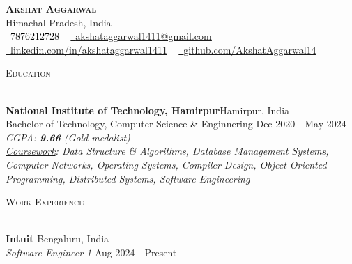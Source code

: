\documentclass[a4paper]{article}
\newcommand{\tinyBulletSep} { \vspace{2mm} }
\newcommand{\bulletSep} { \vspace{2.5mm} }
\newcommand{\sectionSep} { \vspace{3.5mm} }
\newcommand{\lineunder} {
    \vspace*{-8pt} \\
    \hspace*{-15pt} \hrulefill \\
}
\newcommand{\header} [1] {
    {\hspace*{-18pt}\vspace*{6pt} {
        \fontfamily{qcs}\selectfont \large \scshape #1
    }}
    \vspace*{-6pt} \lineunder
    \vspace{1.1mm}
}
\newcommand{\educationItem}[6]{
    \textbf{#1}\hfill #2\\
    #3 \hfill #5\\
    \textit{#4}\\
    #6
}
\newcommand{\experienceItem}[5]{
    \textbf{#1} \hfill #2 \\
    \textit{#3} \hfill #4 \\
    #5
}
\newcommand{\link}[2]{
    {\fontfamily{lmtt}\selectfont\href{#1}{#2}}
}
\begin{document}

\begin{center}
    {\textbf{\Huge \scshape Akshat Aggarwal}} \\ \vspace{1pt}
    Himachal Pradesh, India \\
    \small \textcolor{black}{\raisebox{-0.1\height}\faPhone\
        7876212728} ~ \href{mailto:akshataggarwal1411@gmail.com}{{\raisebox{-0.2\height}\faEnvelope\  \underline{akshataggarwal1411@gmail.com}}} ~
    \href{https://www.linkedin.com/in/akshataggarwal1411/}{{\raisebox{-0.2\height}\faLinkedinSquare\ \underline{linkedin.com/in/akshataggarwal1411}}}  ~
    \href{https://github.com/AkshatAggarwal14}{{\raisebox{-0.2\height}\faGithub\ \underline{github.com/AkshatAggarwal14}}}
\end{center}

\vspace{-2mm}

\hypersetup {
    urlcolor     = blue, %
}


\header{Education}

\educationItem{National Institute of Technology, Hamirpur}{Hamirpur, India}{Bachelor of Technology, Computer Science \& Enginnering}{CGPA: \textbf{9.66} (Gold medalist)}{Dec 2020 - May 2024}{
    \tinyBulletSep
    \textit{\underline{Coursework}: Data Structure \& Algorithms, Database Management Systems, Computer Networks, Operating Systems, Compiler Design, Object-Oriented Programming, Distributed Systems, Software Engineering}

}


\sectionSep


\header{Work Experience}

\experienceItem{Intuit}{Bengaluru, India}{Software Engineer 1}{Aug 2024 - Present}{
}
\bulletSep
\end{document}
